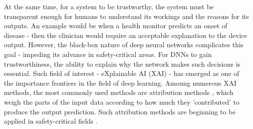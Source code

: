 At the same time, for a system to be trustworthy, 
the system must be transparent enough for humans 
to understand its workings and the reasons for its outputs.
%
%
An example would be when a health monitor 
predicts an onset of disease \cite{xu2019current}
- then the clinician would require an acceptable
explanation to the device output.
%
%
However, the black-box nature of deep neural 
networks complicates this goal - impeding its 
advance in safety-critical areas.
%
%
For DNNs to gain trustworthiness, the ability 
to explain why the network makes such decisions 
is essential. Such field of interest - 
eXplainable AI (XAI) - has emerged as one of the 
importance frontiers in the field of deep learning.
%
%
Amoung numerous XAI methods, the most commonly 
used methods are attribution methods \cite{selvaraju2017grad}, 
which weigh the parts of the input data according to 
how much they 'contributed' to produce the output prediction.
%
%
Such attribution methods are beginning to be applied
in safety-critical fields \cite{liang2020prediction}.

